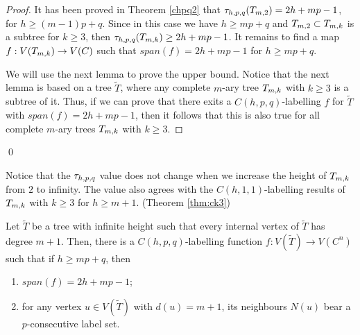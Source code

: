 \begin{proof}
It has been proved in Theorem \ref{chpq2} that $\thpq(\tm2) = 2h+mp-1$, for $h \ge (m-1)p+q$. Since in this case we have $h \ge mp+q$ and $\tm2 \subset \tmk$ is a subtree for $k \ge 3$, then $\tau_{h,p,q}(T_{m,k}) \ge 2h+mp-1$. It remains to find a map $f:V(T_{m,k}) \rightarrow V(C)$ such that $span(f) = 2h+mp-1$ for $h \ge mp+q$. 

We will use the next lemma to prove the upper bound. Notice that the next lemma is based on a tree $\tilde{T}$, where any complete $m$-ary tree $T_{m,k}$ with $k \ge 3$ is a subtree of it. Thus, if we can prove that there exits a $C(h,p,q)$-labelling $f$ for $\tilde{T}$ with $span(f) = 2h+mp-1$, then it follows that this is also true for all complete $m$-ary trees $T_{m,k}$ with $k \ge 3$.  
\end{proof}
\qed 

Notice that the $\tau_{h,p,q}$ value does not change when we increase the height of $T_{m,k}$ from $2$ to infinity. The value also agrees with the $C(h,1,1)$-labelling results of $T_{m,k}$ with $k \ge 3$ for $h \ge m+1$. (Theorem \ref{thm:ck3}) 


\begin{lemma}
\label{lem:consecutive2}
Let $\tilde{T}$ be a tree with infinite height such that every internal vertex of $\tilde{T}$ has degree $m+1$. Then, there is a $C(h,p,q)$-labelling function $f: V(\tilde{T}) \rightarrow V(C^n)$ such that if $h \ge mp+q$,  then 
\begin{enumerate}[(1)] 
\item $span(f) = 2h+mp-1$;
\item for any vertex $u \in V(\tilde{T})$ with $d(u) = m+1$, its neighbours $N(u)$ bear a $p$-consecutive label set. 
\end{enumerate}
\end{lemma}

